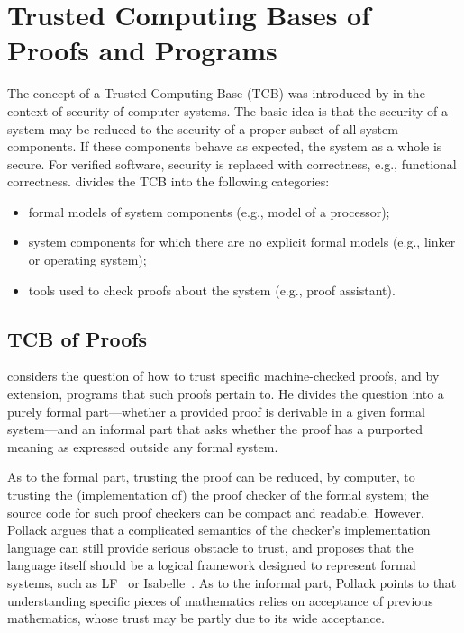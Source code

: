  
\section{Trusted Computing Bases of Proofs and Programs}
\label{sec:trustedbases}

The concept of a Trusted Computing Base (TCB) was introduced by \cite{Rushby1981} in the context of security of computer systems. The basic idea is that the security of a system may be reduced to the security of a proper subset of all system components. If these components behave as expected, the system as a whole is secure. For verified software, security is replaced with correctness, e.g., functional correctness. \cite{Kumar2015} divides the TCB into the following categories:
\begin{itemize}
\item formal models of system components (e.g., model of a processor);
\item system components for which there are no explicit formal models (e.g., linker or operating system);
\item tools used to check proofs about the system (e.g., proof assistant).
\end{itemize}

\subsection{TCB of Proofs}
\label{sec:trust-proofs}

\cite{Pollack1998} considers the question of how to trust specific machine-checked proofs, and by extension, programs that such proofs pertain to. He divides the question into a purely formal part---whether a provided proof is derivable in a given formal system---and an informal part that asks whether the proof has a purported meaning as expressed outside any formal system. 

As to the formal part, trusting the proof can be reduced, by computer, to trusting the (implementation of) the proof checker of the formal system; the source code for such proof checkers can be compact and readable. However, Pollack argues that a complicated semantics of the checker's implementation language can still provide serious obstacle to trust, and proposes that the language itself should be a logical framework designed to represent formal systems, such as LF~\citep{Harper1993} or Isabelle~\citep{Paulson1994}. As to the informal part, Pollack points to that understanding specific pieces of mathematics relies on acceptance of previous mathematics, whose trust may be partly due to its wide acceptance. 

